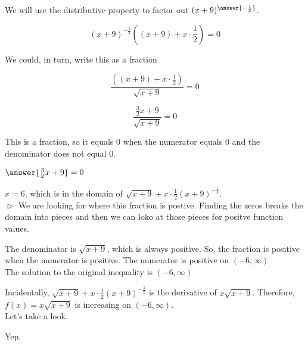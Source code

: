 \documentclass{ximera}
\begin{document}
\begin{example}
\begin{explanation}
We will use the distributive property to factor out $(x+9)^{\answer{-\frac{1}{2}}}$.


\[ (x+9)^{-\tfrac{1}{2}} \left((x+9) + x \cdot \frac{1}{2}\right)  = 0 \]


We could, in turn, write this as a fraction


\[ \frac{\left((x+9) + x \cdot \frac{1}{2}\right)}{\sqrt{x+9}} = 0 \]


\[ \frac{ \frac{3}{2} x + 9}{\sqrt{x+9}} = 0 \]



This is a fraction, so it equals $0$ when the numerator equals $0$ and the denominator does not equal $0$.


$\answer{\frac{3}{2} x + 9} = 0$



$x = 6$, which is in the domain of $\sqrt{x+9} + x \cdot \frac{1}{2} (x+9)^{-\tfrac{1}{2}}$. \\

$\vartriangleright$ We are looking for where this fraction is postive. Finding the zeros breaks the domain into pieces and then we can loko at those pieces for positve function values.

The denominator is $\sqrt{x+9}$, which is always positive.  So, the fraction is positive when the numerator is positive.  The numerator is positive on $(-6, \infty)$ \\





The solution to the original inequality is $(-6, \infty)$


\end{explanation}

\end{example}



Incidentally, $\sqrt{x+9} + x \cdot \frac{1}{2} (x+9)^{-\tfrac{1}{2}}$ is the derivative of $x \sqrt{x+9}$. Therefore, $f(x) = x \sqrt{x+9}$ is increasing on $(-6, \infty)$. \\

Let's take a look.







\begin{center}
\end{center}


Yep.
\end{document}

